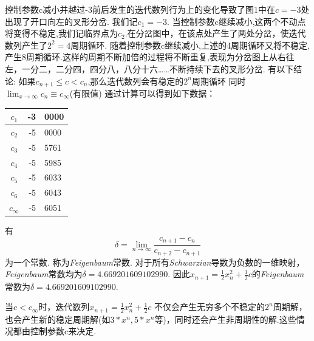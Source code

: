 \documentclass[a4paper]{article}%
\begin{document}
控制参数c减小并越过-3前后发生的迭代数列行为上的变化导致了图1中在$c=-3$处出现了开口向左的叉形分岔.
我们记$c_1=-3$.
当控制参数c继续减小,这两个不动点将变得不稳定,我们记临界点为$c_2$.在分岔图中，在该点处产生了两处分岔，使迭代数列产生了$2^2=4$周期循环.
随着控制参数c继续减小,上述的4周期循环又将不稳定,产生8周期循环.这样的周期不断加倍的过程将不断重复,表现为分岔图上从右往左，一分二，二分四，四分八，八分十六……不断持续下去的叉形分岔.
有以下结论:
如果$c_{n+1}\le c<c_n$,那么迭代数列会有稳定的$2^n$周期循环
同时
$\lim_{x\to\infty}c_n\equiv c_{\infty}$(有限值)
通过计算可以得到如下数据：\\
\begin{center}
\begin{tabular}{|c|r@{.}l|}
    \hline
$c_{1}$ & -3&0000 \\ \hline
$c_{2}$ & -5&0000 \\ \hline
 $c_{3}$ & -5&5761 \\ \hline
 $c_{4}$ & -5&5985 \\ \hline
 $c_{5}$ & -5&6033 \\ \hline
 $c_{6}$ & -5&6043 \\ \hline
 $c_{\infty}$ & -5&6051 \\ \hline
\end{tabular}
\end{center}

有\[\delta =\lim_{n\to\infty}\frac{c_{n+1}-c_n}{c_{n+2}-c_{n+1}}\]
为一个常数\cite{a}.
称为\textsl{Feigenbaum}常数.
对于所有\textsl{Schwarzian}导数为负数的一维映射，\textsl{Feigenbaum}常数均为$\delta=4.669201609102990$.\cite{b}
因此$x_{n+1}=\frac{1}{2}x_{n}^2+\frac{1}{2}c$的\textsl{Feigenbaum}常数为$\delta=4.669201609102990$.

当$c<c_{\infty}$时，迭代数列$x_{n+1}=\frac{1}{2}x_{n}^2+\frac{1}{2}c$
不仅会产生无穷多个不稳定的$2^n$周期解，也会产生新的稳定周期解(如$3*x^n,5*x^n$等)，同时还会产生非周期性的解.这些情况都由控制参数c来决定.
\end{document}
